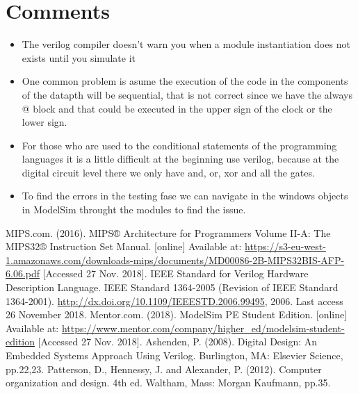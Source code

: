 \documentclass[conference]{IEEEtran}
\begin{document}
\section{Comments}
\begin{itemize}
\item The verilog compiler doesn't warn you when a module  instantiation does not exists until you simulate it
\item One common problem is asume the execution of the code in the components of the datapth will be sequential, 
that is not correct since we have the always @ block and that could be executed in the upper sign of the clock 
or the lower sign.
\item For those who are used to the conditional statements of the programming languages it is a little difficult at the 
beginning use verilog, because at the digital circuit level there we only have and, or, xor and all the gates.
\item To find the errors in the testing fase we can navigate in the windows objects in ModelSim throught the modules
to find the issue.
\end{itemize}

\begin{thebibliography}{00}
 MIPS.com. (2016). MIPS® Architecture for Programmers Volume II-A: The MIPS32® Instruction Set Manual. [online] Available at: \url{https://s3-eu-west-1.amazonaws.com/downloads-mips/documents/MD00086-2B-MIPS32BIS-AFP-6.06.pdf} [Accessed 27 Nov. 2018].
 IEEE Standard for Verilog Hardware Description Language. IEEE Standard 1364-2005 (Revision of IEEE Standard 1364-2001). \url{http://dx.doi.org/10.1109/IEEESTD.2006.99495}, 2006. Last access 26 November 2018.
 Mentor.com. (2018). ModelSim PE Student Edition. [online] Available at: \url{https://www.mentor.com/company/higher_ed/modelsim-student-edition} [Accessed 27 Nov. 2018].
 Ashenden, P. (2008). Digital Design: An Embedded Systems Approach Using Verilog. Burlington, MA: Elsevier Science, pp.22,23.
 Patterson, D., Hennessy, J. and Alexander, P. (2012). Computer organization and design. 4th ed. Waltham, Mass: Morgan Kaufmann, pp.35.
\end{thebibliography}
\vspace{12pt}
\end{document}

